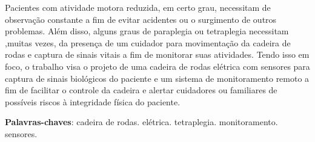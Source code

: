 \begin{resumo}
 Pacientes com atividade motora reduzida, em certo grau, necessitam de observação constante a fim de evitar acidentes ou o surgimento de outros problemas. Além disso, alguns graus de paraplegia ou tetraplegia necessitam ,muitas vezes, da presença de um cuidador para movimentação da cadeira de rodas e captura de sinais vitais a fim de monitorar suas atividades. Tendo isso em foco, o trabalho visa o projeto de uma cadeira de rodas elétrica com sensores para captura de sinais biológicos do paciente e um sistema de monitoramento remoto a fim de facilitar o controle da cadeira e alertar cuidadores ou familiares de possíveis riscos à integridade física do paciente.

 \vspace{\onelineskip}
    
 \noindent
 \textbf{Palavras-chaves}: cadeira de rodas. elétrica. tetraplegia. monitoramento. sensores.
\end{resumo}
